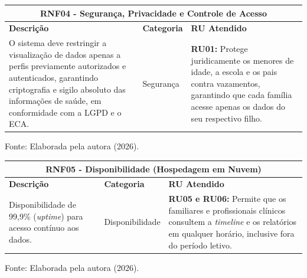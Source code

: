 \begin{quadro}[H]
    \centering
    \caption{RNF04: Segurança, Privacidade e Controle de Acesso}
    \label{quadro:rnf04}
    \renewcommand{\arraystretch}{1.5}
    \begin{tabular}{|p{5.5cm}|p{2.5cm}|p{7cm}|}
        \hline
        \multicolumn{3}{|c|}{\textbf{RNF04 - Segurança, Privacidade e Controle de Acesso}} \\ \hline
        \textbf{Descrição} & \textbf{Categoria} & \textbf{RU Atendido} \\ \hline
        O sistema deve restringir a visualização de dados apenas a perfis previamente autorizados e autenticados, garantindo criptografia e sigilo absoluto das informações de saúde, em conformidade com a LGPD e o ECA. & Segurança & \textbf{RU01:} Protege juridicamente os menores de idade, a escola e os pais contra vazamentos, garantindo que cada família acesse apenas os dados do seu respectivo filho. \\ \hline
    \end{tabular}
    
    \vspace{0.1cm}
    \begin{flushleft}
        \footnotesize Fonte: Elaborada pela autora (2026).
    \end{flushleft}
\end{quadro}

\begin{quadro}[H]
    \centering
    \caption{RNF05: Disponibilidade (Hospedagem em Nuvem)}
    \label{quadro:rnf05}
    \renewcommand{\arraystretch}{1.5}
    \begin{tabular}{|p{5.5cm}|p{2.5cm}|p{7cm}|}
        \hline
        \multicolumn{3}{|c|}{\textbf{RNF05 - Disponibilidade (Hospedagem em Nuvem)}} \\ \hline
        \textbf{Descrição} & \textbf{Categoria} & \textbf{RU Atendido} \\ \hline
        Disponibilidade de 99,9\% (\textit{uptime}) para acesso contínuo aos dados. & Disponibilidade & \textbf{RU05 e RU06:} Permite que os familiares e profissionais clínicos consultem a \textit{timeline} e os relatórios em qualquer horário, inclusive fora do período letivo. \\ \hline
    \end{tabular}
    
    \vspace{0.1cm}
    \begin{flushleft}
        \footnotesize Fonte: Elaborada pela autora (2026).
    \end{flushleft}
\end{quadro}

